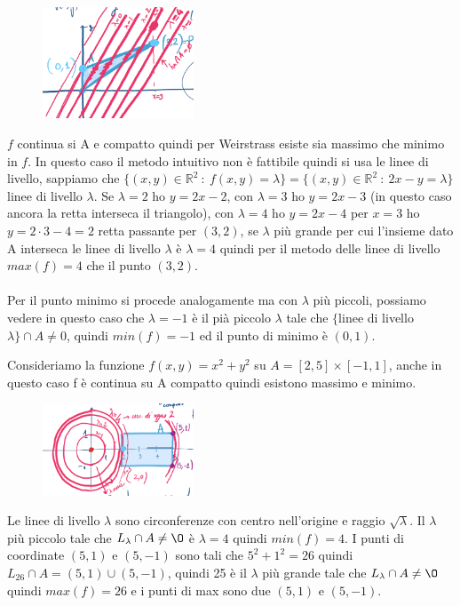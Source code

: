 \begin{figure}
    \vspace{-10pt}
    \centering
    \includegraphics[width=4.5cm]{images/max-min-ess-insiemi-livello-2.png}
\end{figure}
$f$ continua si A e compatto quindi per Weirstrass esiste sia massimo che minimo in $f$. In questo caso il metodo intuitivo non è fattibile quindi si usa le linee di livello, sappiamo che $\{(x,y) \in \mathbb{R}^2 \::\: f(x,y) = \lambda\} = \{(x,y) \in \mathbb{R}^2 \::\: 2x-y = \lambda\}$ linee di livello $\lambda$. Se $\lambda = 2$ ho $y = 2x -2$, con $\lambda = 3$ ho $y = 2x -3$ (in questo caso ancora la retta interseca il triangolo), con $\lambda = 4$ ho $y = 2x - 4$ per $x = 3$ ho $y= 2 \cdot 3 - 4 = 2$ retta passante per $(3,2)$, se $\lambda$ più grande per cui l'insieme dato A interseca le linee di livello $\lambda$ è $\lambda = 4$ quindi per il metodo delle linee di livello $max(f) = 4$ che il punto $(3,2)$.\\\\
Per il punto minimo si procede analogamente ma con $\lambda$ più piccoli, possiamo vedere in questo caso che $\lambda = -1$ è il pià piccolo $\lambda$ tale che $\{$linee di livello $\lambda\} \cap A \neq 0$, quindi $min(f) = -1$ ed il punto di minimo è $(0,1)$.

\begin{example}
Consideriamo la funzione $f(x,y) = x^2 + y^2$ su $A = [2,5] \times [-1,1]$, anche in questo caso f è continua su A compatto quindi esistono massimo e minimo.
\end{example}
\begin{figure}
    \vspace{-10pt}
    \centering
    \includegraphics[width=4.5cm]{images/max-min-ess-insiemi-livello-3.png}
\end{figure}
Le linee di livello $\lambda$ sono circonferenze con centro nell'origine e raggio $\sqrt{\lambda}$. Il $\lambda$ più piccolo tale che $L_{\lambda} \cap A \neq \O$ è $\lambda = 4$ quindi $min(f) = 4$. I punti di coordinate $(5,1)$ e $(5,-1)$ sono tali che $5^2 + 1^2 = 26$ quindi $L_{26} \cap A = (5,1) \cup (5,-1)$, quindi 25 è il $\lambda$ più grande tale che $L_{\lambda} \cap A \neq \O$ quindi $max(f) = 26$ e i punti di max sono due $(5,1)$ e $(5,-1)$.\\

